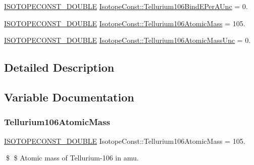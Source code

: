 \begin{DoxyCompactItemize}
\mbox{\hyperlink{group___isotope_const-_macros_ga8f45a7272ce02c0b4c65c44636ed719a}{I\+S\+O\+T\+O\+P\+E\+C\+O\+N\+S\+T\+\_\+\+D\+O\+U\+B\+LE}} \mbox{\hyperlink{group___isotope_const-_tellurium-_te106_ga0f1fd37364d33564505274213a4257b3}{Isotope\+Const\+::\+Tellurium106\+Bind\+E\+Per\+A\+Unc}} = 0.
\item 
\mbox{\hyperlink{group___isotope_const-_macros_ga8f45a7272ce02c0b4c65c44636ed719a}{I\+S\+O\+T\+O\+P\+E\+C\+O\+N\+S\+T\+\_\+\+D\+O\+U\+B\+LE}} \mbox{\hyperlink{group___isotope_const-_tellurium-_te106_gaabb42e469113fa4eb79598e5567a79a2}{Isotope\+Const\+::\+Tellurium106\+Atomic\+Mass}} = 105.
\item 
\mbox{\hyperlink{group___isotope_const-_macros_ga8f45a7272ce02c0b4c65c44636ed719a}{I\+S\+O\+T\+O\+P\+E\+C\+O\+N\+S\+T\+\_\+\+D\+O\+U\+B\+LE}} \mbox{\hyperlink{group___isotope_const-_tellurium-_te106_ga33bdd47a22b744874d06735c8259bac5}{Isotope\+Const\+::\+Tellurium106\+Atomic\+Mass\+Unc}} = 0.
\end{DoxyCompactItemize}


\subsection{Detailed Description}


\subsection{Variable Documentation}
\mbox{\label{group___isotope_const-_tellurium-_te106_gaabb42e469113fa4eb79598e5567a79a2}} 
\subsubsection{\texorpdfstring{Tellurium106\+Atomic\+Mass}{Tellurium106AtomicMass}}
{\footnotesize\ttfamily \mbox{\hyperlink{group___isotope_const-_macros_ga8f45a7272ce02c0b4c65c44636ed719a}{I\+S\+O\+T\+O\+P\+E\+C\+O\+N\+S\+T\+\_\+\+D\+O\+U\+B\+LE}} Isotope\+Const\+::\+Tellurium106\+Atomic\+Mass = 105.}

\$ \$ Atomic mass of Tellurium-\/106 in amu. \mbox{\label{group___isotope_const-_tellurium-_te106_ga33bdd47a22b744874d06735c8259bac5}} 
